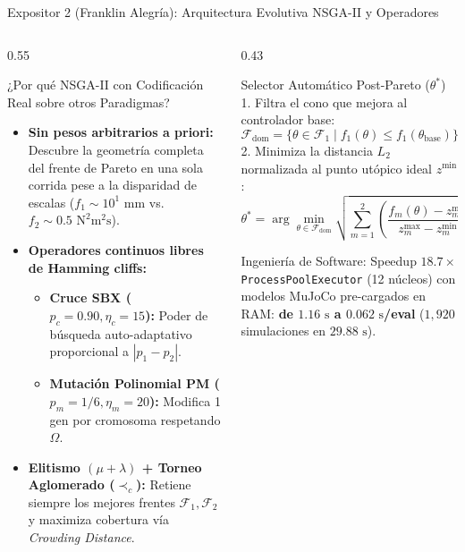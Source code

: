 \documentclass[aspectratio=169,10pt]{beamer}
\begin{document}
\begin{frame}{Expositor 2 (Franklin Alegría): Arquitectura Evolutiva NSGA-II y Operadores}
\begin{columns}[T,onlytextwidth]
\begin{column}{0.55\textwidth}
    \begin{block}{¿Por qué NSGA-II con Codificación Real sobre otros Paradigmas?}
        \begin{itemize}
            \item \textbf{Sin pesos arbitrarios a priori:} Descubre la geometría completa del frente de Pareto en una sola corrida pese a la disparidad de escalas ($f_1 \sim 10^1\text{ mm}$ vs. $f_2 \sim 0.5\text{ N}^2\text{m}^2\text{s}$).
            \item \textbf{Operadores continuos libres de Hamming cliffs:}
            \begin{itemize}
                \item \textbf{Cruce SBX ($p_c=0.90, \eta_c=15$):} Poder de búsqueda auto-adaptativo proporcional a $|p_1 - p_2|$.
                \item \textbf{Mutación Polinomial PM ($p_m=1/6, \eta_m=20$):} Modifica 1 gen por cromosoma respetando $\Omega$.
            \end{itemize}
            \item \textbf{Elitismo $(\mu+\lambda)$ + Torneo Aglomerado ($\prec_c$):} Retiene siempre los mejores frentes $\mathcal{F}_1, \mathcal{F}_2$ y maximiza cobertura vía \textit{Crowding Distance}.
        \end{itemize}
    \end{block}
\end{column}
\begin{column}{0.43\textwidth}
    \begin{exampleblock}{Selector Automático Post-Pareto ($\theta^*$)}
        1. Filtra el cono que mejora al controlador base:
        \[
            \mathcal{F}_{\text{dom}} = \{\theta \in \mathcal{F}_1 \mid f_1(\theta) \le f_1(\theta_{\text{base}})\}
        \]
        2. Minimiza la distancia $L_2$ normalizada al punto utópico ideal $z^{\min}$:
        \[
            \theta^* = \arg\min_{\theta \in \mathcal{F}_{\text{dom}}} \sqrt{\sum_{m=1}^2 \left(\frac{f_m(\theta)-z_m^{\min}}{z_m^{\max}-z_m^{\min}}\right)^2}
        \]
    \end{exampleblock}
    \begin{alertblock}{Ingeniería de Software: Speedup $18.7\times$}
        \texttt{ProcessPoolExecutor} (12 núcleos) con modelos MuJoCo pre-cargados en RAM: \textbf{de $1.16\text{ s}$ a $0.062\text{ s}$/eval} ($1,920$ simulaciones en \textbf{$29.88\text{ s}$}).
    \end{alertblock}
\end{column}
\end{columns}
\end{frame}
\end{document}
